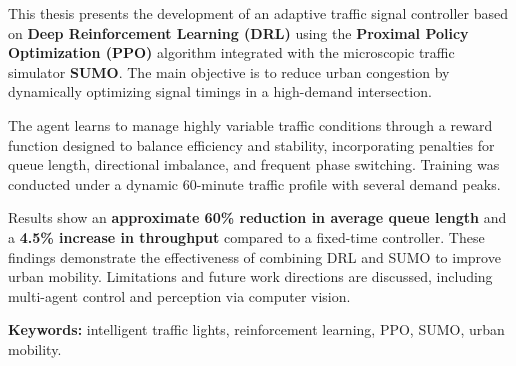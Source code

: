 This thesis presents the development of an adaptive traffic signal controller based on \textbf{Deep Reinforcement Learning (DRL)} using the \textbf{Proximal Policy Optimization (PPO)} algorithm integrated with the microscopic traffic simulator \textbf{SUMO}. The main objective is to reduce urban congestion by dynamically optimizing signal timings in a high-demand intersection.

The agent learns to manage highly variable traffic conditions through a reward function designed to balance efficiency and stability, incorporating penalties for queue length, directional imbalance, and frequent phase switching. Training was conducted under a dynamic 60-minute traffic profile with several demand peaks.

Results show an \textbf{approximate 60\% reduction in average queue length} and a \textbf{4.5\% increase in throughput} compared to a fixed-time controller. These findings demonstrate the effectiveness of combining DRL and SUMO to improve urban mobility. Limitations and future work directions are discussed, including multi-agent control and perception via computer vision.

\vspace{1em}
\noindent \textbf{Keywords:} intelligent traffic lights, reinforcement learning, PPO, SUMO, urban mobility.